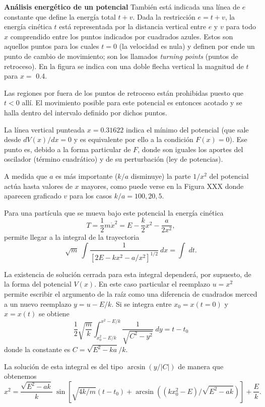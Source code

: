 \documentclass[10pt,oneside]{CBFT_book}
\begin{document}
\begin{ejemplo}{\bfseries Análisis energético de un potencial }
También está indicada una línea de $ e $ constante que define la energía total $t + v$. Dada la restricción $ e = t + 
v$, la energía cinética $t$ está representada por la distancia vertical entre $e$ y $v$ para todo $x$ comprendido entre 
los puntos indicados por cuadrados azules. Estos son aquellos puntos para los cuales $t=0$ (la velocidad es nula) y 
definen por ende un punto de cambio de movimiento; son los llamados {\it turning points} (puntos de retroceso). 
En la figura se indica con una doble flecha vertical la magnitud de $t$ para $x =$ 0.4.

Las regiones por fuera de los puntos de retroceso están prohibidas puesto que $ t < 0 $ allí.
El movimiento posible para este potencial es entonces acotado y se halla dentro del intervalo definido por dichos 
puntos.

La línea vertical punteada $x=0.31622$ indica el mínimo del potencial (que sale desde $ dV(x)/dx = 0 $ y es 
equivalente por ello a la condición $ F(x)= 0 $). Ese punto es, debido a la forma particular de $F$, donde son iguales 
los aportes del oscilador (término cuadrático) y de su perturbación (ley de potencias).

A medida que $ a $ es más importante ($k/a$ disminuye) la parte $ 1 / x^2 $ del potencial actúa hasta valores de $ x $ 
mayores, como puede verse en la Figura XXX donde aparecen graficado $v$ para los casos $ k/a = 100, 20, 5 $.


Para una partícula que se mueva bajo este potencial la energía cinética
\[
	T = \frac{1}{2} m \dot{x}^2 = E - \frac{k}{2} x^2 - \frac{a}{2 x^2},
\]
permite llegar a la integral de la trayectoria
\[
	\sqrt{m} \: \int \frac{1}{ \left[ 2E - kx^2 - a/x^2 \right]^{1/2} } \: dx = \int \; dt.
\]

La existencia de solución cerrada para esta integral dependerá, por supuesto, de la forma del potencial $V(x)$.
En este caso particular el reemplazo $ u = x^2 $ permite escribir el argumento de la raíz como una diferencia de
cuadrados merced a un nuevo reemplazo $ y = u - E/k $. 
Si se integra entre $ x_0 = x(t=0) $ y $ x = x(t) $ se obtiene 
\[
	\frac{1}{2}\sqrt{\frac{m}{k}} \int_{x_0^2 - E/k}^{{x^2 - E/k}} \frac{1}{\sqrt{C^2 - y^2}} \; dy = t - t_0
\]
donde la constante es $ C = \sqrt{E^2 - ka}/k $.

La solución de esta integral es del tipo $ \arcsin(y/|C|) $ de manera que obtenemos
\[
	x^2 = \frac{\sqrt{E^2 - ak}}{k} \: \sin 
	\left[ \sqrt{4k/m}(t-t_0) + \arcsin ( (kx_0^2- E)/\sqrt{E^2 -ak }) \right] + \frac{E}{k}.
\]


\end{ejemplo}
\end{document}

